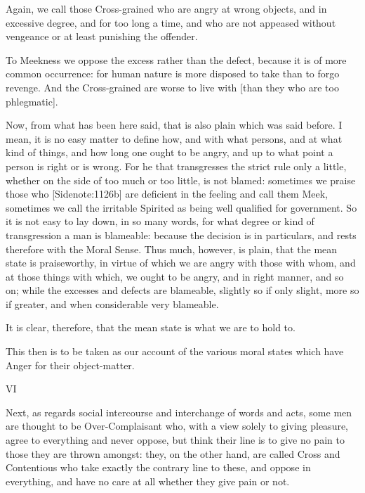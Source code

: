 Again, we call those Cross-grained who are angry at wrong objects, and
in excessive degree, and for too long a time, and who are not appeased
without vengeance or at least punishing the offender.

To Meekness we oppose the excess rather than the defect, because it is
of more common occurrence: for human nature is more disposed to take
than to forgo revenge. And the Cross-grained are worse to live with
[than they who are too phlegmatic].

Now, from what has been here said, that is also plain which was said
before. I mean, it is no easy matter to define how, and with what
persons, and at what kind of things, and how long one ought to be
angry, and up to what point a person is right or is wrong. For he that
transgresses the strict rule only a little, whether on the side of
too much or too little, is not blamed: sometimes we praise those who
[Sidenote:1126b] are deficient in the feeling and call them Meek,
sometimes we call the irritable Spirited as being well qualified for
government. So it is not easy to lay down, in so many words, for what
degree or kind of transgression a man is blameable: because the decision
is in particulars, and rests therefore with the Moral Sense. Thus much,
however, is plain, that the mean state is praiseworthy, in virtue of
which we are angry with those with whom, and at those things with which,
we ought to be angry, and in right manner, and so on; while the excesses
and defects are blameable, slightly so if only slight, more so if
greater, and when considerable very blameable.

It is clear, therefore, that the mean state is what we are to hold to.

This then is to be taken as our account of the various moral states
which have Anger for their object-matter.

VI

Next, as regards social intercourse and interchange of words and acts,
some men are thought to be Over-Complaisant who, with a view solely to
giving pleasure, agree to everything and never oppose, but think their
line is to give no pain to those they are thrown amongst: they, on
the other hand, are called Cross and Contentious who take exactly the
contrary line to these, and oppose in everything, and have no care at
all whether they give pain or not.


